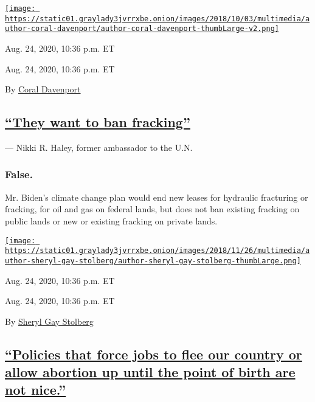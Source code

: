 \href{https://www.nytimes3xbfgragh.onion/by/coral-davenport}{\texttt{[image: https://static01.graylady3jvrrxbe.onion/images/2018/10/03/multimedia/author-coral-davenport/author-coral-davenport-thumbLarge-v2.png]}}

Aug. 24, 2020, 10:36 p.m. ET

Aug. 24, 2020, 10:36 p.m. ET

By \href{https://www.nytimes3xbfgragh.onion/by/coral-davenport}{Coral
Davenport}

\hypertarget{they-want-to-ban-fracking}{%
\subsection{\texorpdfstring{\protect\hyperlink{they-want-to-ban-fracking}{``They
want to ban
fracking''}}{``They want to ban fracking''}}\label{they-want-to-ban-fracking}}

--- Nikki R. Haley, former ambassador to the U.N.

\hypertarget{false}{%
\subsubsection{False.}\label{false}}

Mr. Biden's climate change plan would end new leases for hydraulic
fracturing or fracking, for oil and gas on federal lands, but does not
ban existing fracking on public lands or new or existing fracking on
private lands.

\href{https://www.nytimes3xbfgragh.onion/by/sheryl-gay-stolberg}{\texttt{[image: https://static01.graylady3jvrrxbe.onion/images/2018/11/26/multimedia/author-sheryl-gay-stolberg/author-sheryl-gay-stolberg-thumbLarge.png]}}

Aug. 24, 2020, 10:36 p.m. ET

Aug. 24, 2020, 10:36 p.m. ET

By
\href{https://www.nytimes3xbfgragh.onion/by/sheryl-gay-stolberg}{Sheryl
Gay Stolberg}

\hypertarget{policies-that-force-jobs-to-flee-our-country-or-allow-abortion-up-until-the-point-of-birth-are-not-nice}{%
\subsection{\texorpdfstring{\protect\hyperlink{policies-that-force-jobs-to-flee-our-country-or-allow-abortion-up-until-the-point-of-birth-are-not-nice}{``Policies
that force jobs to flee our country or allow abortion up until the point
of birth are not
nice.''}}{``Policies that force jobs to flee our country or allow abortion up until the point of birth are not nice.''}}\label{policies-that-force-jobs-to-flee-our-country-or-allow-abortion-up-until-the-point-of-birth-are-not-nice}}


